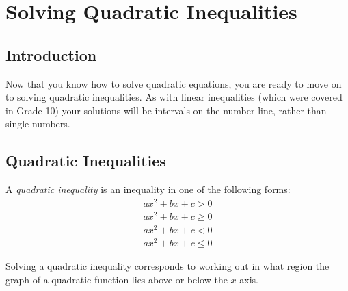 \chapter{Solving Quadratic Inequalities}
\label{m:se:qineq11}

\section{Introduction}
Now that you know how to solve quadratic equations, you are ready to
move on to solving quadratic inequalities. As with linear inequalities
(which were covered in Grade 10) your solutions will be intervals on
the number line, rather than single numbers.


\section{Quadratic Inequalities}

A \emph{quadratic inequality} is an inequality in one of the following forms:
\begin{eqnarray*}
ax^{2} + bx + c > 0\\
ax^{2} + bx + c \geq 0\\
ax^{2} + bx + c < 0\\
ax^{2} + bx + c \leq 0
\end{eqnarray*}

Solving a quadratic inequality corresponds to working out in what region the graph of a quadratic function lies above or below the $x$-axis.

